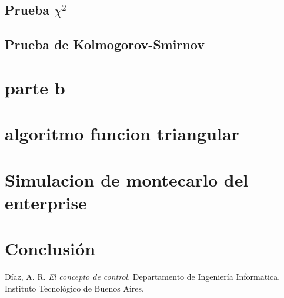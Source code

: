 \documentclass[10pt,journal,compsoc]{IEEEtran}
\begin{document}
\subsection{Prueba $\chi^2$}

\subsection{Prueba de Kolmogorov-Smirnov}


\section{parte b}

\section{algoritmo funcion triangular}

\section{Simulacion de montecarlo del enterprise}



%

\section{Conclusi\'on}

\begin{thebibliography}{1}

D\'iaz, A. R. \emph{El concepto de control}. Departamento de Ingenier\'ia Informatica. 
Instituto Tecnol\'ogico de Buenos Aires.
\end{thebibliography}
\end{document}
